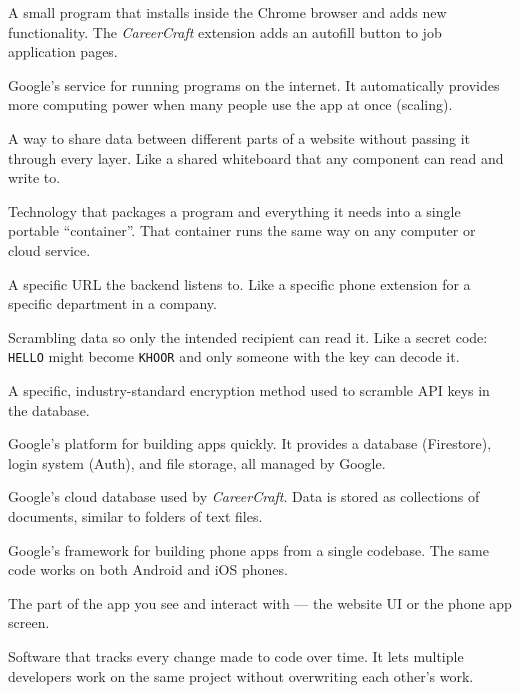 \documentclass[12pt, a4paper]{report}
\newcommand{\cc}{\textit{CareerCraft}}
\newcommand{\code}[1]{\texttt{\small #1}}
\begin{document}
\begin{description}[style=nextline, leftmargin=3cm, labelwidth=2.8cm, font=\bfseries\color{ccpurple}]
\item[Chrome Extension]
A small program that installs inside the Chrome browser and adds new functionality.
The \cc{} extension adds an autofill button to job application pages.

\item[Cloud Run]
Google's service for running programs on the internet.
It automatically provides more computing power when many people use the app at once (scaling).

\item[Context (React)]
A way to share data between different parts of a website without passing it through every layer.
Like a shared whiteboard that any component can read and write to.

\item[Docker]
Technology that packages a program and everything it needs into a single portable ``container''.
That container runs the same way on any computer or cloud service.

\item[Endpoint]
A specific URL the backend listens to.
Like a specific phone extension for a specific department in a company.

\item[Encryption]
Scrambling data so only the intended recipient can read it.
Like a secret code: \code{HELLO} might become \code{KHOOR} and only someone with the key can decode it.

\item[Fernet]
A specific, industry-standard encryption method used to scramble API keys in the database.

\item[Firebase]
Google's platform for building apps quickly.
It provides a database (Firestore), login system (Auth), and file storage, all managed by Google.

\item[Firestore]
Google's cloud database used by \cc{}.
Data is stored as collections of documents, similar to folders of text files.

\item[Flutter]
Google's framework for building phone apps from a single codebase.
The same code works on both Android and iOS phones.

\item[Frontend]
The part of the app you see and interact with --- the website UI or the phone app screen.

\item[Git]
Software that tracks every change made to code over time.
It lets multiple developers work on the same project without overwriting each other's work.


\end{description}
\end{document}
